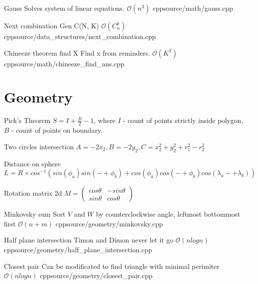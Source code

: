 \documentclass[landscape, 10pt, a4paper, oneside, twocolumn]{extarticle}
\begin{document}
\Algorithm
{Gauss}
{Solves system of linear equations.}
{$\mathcal{O}(n^{3})$}
{cpp}{source/math/gauss.cpp}

\Algorithm
{Next combination}
{Gen C(N, K)}
{$\mathcal{O}(C_{n}^{k})$}
{cpp}{source/data_structures/next_combination.cpp}

\Algorithm
{Chineeze theorem find X}
{Find x from reminders.}
{$\mathcal{O}(K^{2})$}
{cpp}{source/math/chineeze_find_ans.cpp}


\section{Geometry}

\Formula
{Pick's Theorem}
{$S = I + \frac{B}{2} - 1$, where $I$ - count of points strictly inside polygon, $B$ - count of points on boundary.}

\Formula
{Two circles intersection}
{$A = -2 x_{2}, B = - 2 y_{2}, C = x_{2}^{2} + y_{2}^{2} + r_{1}^{2} - r_{2}^{2}$}

\Formula
{Distance on sphere}
{$L = R \times cos^{-1}( sin(\phi_{a}) sin(-+ \phi_{b}) + cos(\phi_{a}) cos(-+ \phi_{b}) cos(\lambda_{a} -+ \lambda_{b}) ) $}

\Formula
{Rotation matrix 2d}
{$M = \left( \begin{smallmatrix} cos\theta & - sin\theta \\ sin\theta & cos\theta \end{smallmatrix} \right)$}


\Algorithm
{Minkovsky sum}
{Sort $V$ and $W$ by counterclockwise angle, leftmost bottommost first}
{$\mathcal{O}(n + m)$}
{cpp}{source/geometry/minkovsky.cpp}

\Algorithm
{Half plane intersection}
{Timon and Dimon never let it go}
{$\mathcal{O}(n logn)$}
{cpp}{source/geometry/half_plane_intersection.cpp}

\Algorithm
{Closest pair}
{Can be modificated to find triangle with minimal perimiter}
{$\mathcal{O}(n logn)$}
{cpp}{source/geometry/closest_pair.cpp}

\end{document}
